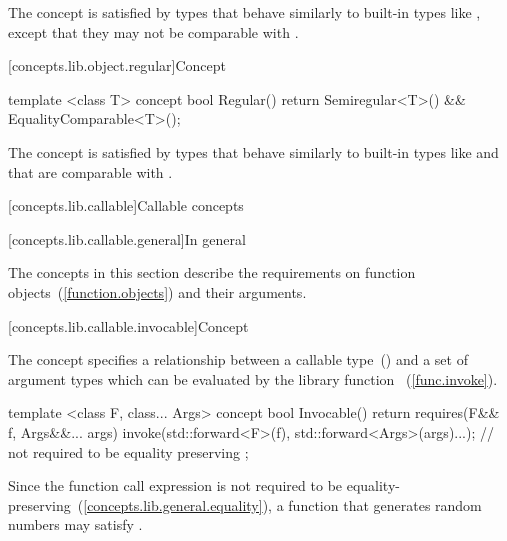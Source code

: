 \begin{itemdescr}
\pnum
\enternote The  concept is satisfied by types that
behave similarly to built-in types like , except that they may not be
comparable with \tcode{==}.\exitnote
\end{itemdescr}

[concepts.lib.object.regular]{Concept }

%
\begin{itemdecl}
template <class T>
concept bool Regular() {
  return Semiregular<T>() &&
    EqualityComparable<T>();
}
\end{itemdecl}

\begin{itemdescr}
\pnum
\enternote The  concept is satisfied by types that behave
similarly to built-in types like  and that are comparable with \tcode{==}.\exitnote
\end{itemdescr}

[concepts.lib.callable]{Callable concepts}

[concepts.lib.callable.general]{In general}

\pnum
The concepts in this section describe the requirements on function
objects~(\ref{function.objects}) and their arguments.

[concepts.lib.callable.invocable]{Concept }

\pnum
The  concept specifies a relationship between a callable
type~()  and a set of argument types  which
can be evaluated by the library function ~(\ref{func.invoke}).

%
\begin{itemdecl}
template <class F, class... Args>
concept bool Invocable() {
  return requires(F&& f, Args&&... args) {
      invoke(std::forward<F>(f), std::forward<Args>(args)...); // not required to be equality preserving
    };
}
\end{itemdecl}

\begin{itemdescr}
\pnum
\enternote Since the  function call
expression is not required to be
equality-preserving~(\ref{concepts.lib.general.equality}), a function that generates random numbers
may satisfy .\exitnote
\end{itemdescr}

